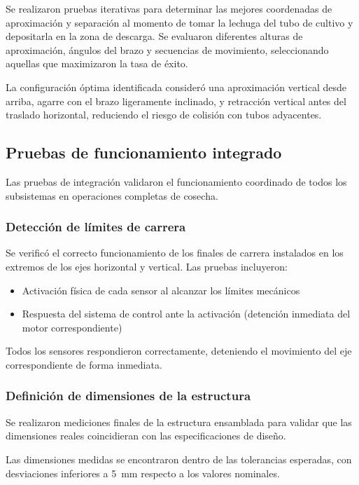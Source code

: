 Se realizaron pruebas iterativas para determinar las mejores coordenadas de aproximación y separación al momento de tomar la lechuga del tubo de cultivo y depositarla en la zona de descarga. Se evaluaron diferentes alturas de aproximación, ángulos del brazo y secuencias de movimiento, seleccionando aquellas que maximizaron la tasa de éxito.

La configuración óptima identificada consideró una aproximación vertical desde arriba, agarre con el brazo ligeramente inclinado, y retracción vertical antes del traslado horizontal, reduciendo el riesgo de colisión con tubos adyacentes.

\subsection{Pruebas de funcionamiento integrado}

Las pruebas de integración validaron el funcionamiento coordinado de todos los subsistemas en operaciones completas de cosecha.

\subsubsection{Detección de límites de carrera}

Se verificó el correcto funcionamiento de los finales de carrera instalados en los extremos de los ejes horizontal y vertical. Las pruebas incluyeron:

\begin{itemize}[label=$\bullet$]
    \item Activación física de cada sensor al alcanzar los límites mecánicos
    \item Respuesta del sistema de control ante la activación (detención inmediata del motor correspondiente)
\end{itemize}

Todos los sensores respondieron correctamente, deteniendo el movimiento del eje correspondiente de forma inmediata.

\subsubsection{Definición de dimensiones de la estructura}

Se realizaron mediciones finales de la estructura ensamblada para validar que las dimensiones reales coincidieran con las especificaciones de diseño.

Las dimensiones medidas se encontraron dentro de las tolerancias esperadas, con desviaciones inferiores a 5~mm respecto a los valores nominales.

